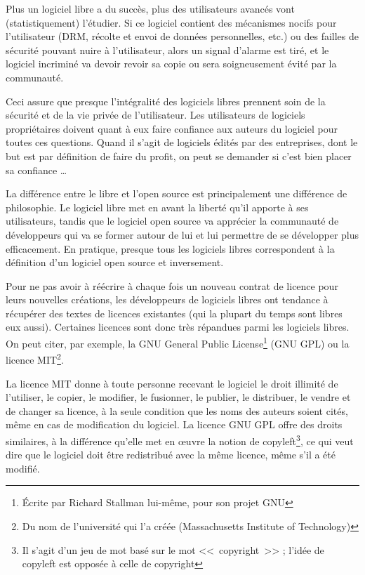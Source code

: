 Plus un logiciel libre a du succès, plus des utilisateurs avancés vont (statistiquement) l'étudier.
Si ce logiciel contient des mécanismes nocifs pour l'utilisateur (DRM, récolte et envoi de données personnelles, etc.) ou des failles de sécurité pouvant nuire à l'utilisateur, alors un signal d'alarme est tiré, et le logiciel incriminé va devoir revoir sa copie ou sera soigneusement évité par la communauté.

Ceci assure que presque l'intégralité des logiciels libres prennent soin de la sécurité et de la vie privée de l'utilisateur.
Les utilisateurs de logiciels propriétaires doivent quant à eux faire confiance aux auteurs du logiciel pour toutes ces questions.
Quand il s'agit de logiciels édités par des entreprises, dont le but est par définition de faire du profit, on peut se demander si c'est bien placer sa confiance \dots{}

La différence entre le libre et l'open source est principalement une différence de philosophie.
Le logiciel libre met en avant la liberté qu'il apporte à ses utilisateurs, tandis que le logiciel open source va apprécier la communauté de développeurs qui va se former autour de lui et lui permettre de se développer plus efficacement.
En pratique, presque tous les logiciels libres correspondent à la définition d'un logiciel open source et inversement.

Pour ne pas avoir à réécrire à chaque fois un nouveau contrat de licence pour leurs nouvelles créations, les développeurs de logiciels libres ont tendance à récupérer des textes de licences existantes (qui la plupart du temps sont libres eux aussi).
Certaines licences sont donc très répandues parmi les logiciels libres.
On peut citer, par exemple, la GNU General Public License\footnote{Écrite par Richard Stallman lui-même, pour son projet GNU} (GNU GPL) ou la licence MIT\footnote{Du nom de l'université qui l'a créée (Massachusetts Institute of Technology)}.

La licence MIT donne à toute personne recevant le logiciel le droit illimité de l'utiliser, le copier, le modifier, le fusionner, le publier, le distribuer, le vendre et de changer sa licence, à la seule condition que les noms des auteurs soient cités, même en cas de modification du logiciel.
La licence GNU GPL offre des droits similaires, à la différence qu'elle met en œuvre la notion de copyleft\footnote{Il s'agit d'un jeu de mot basé sur le mot <<~copyright~>> ; l'idée de copyleft est opposée à celle de copyright}, ce qui veut dire que le logiciel doit être redistribué avec la même licence, même s'il a été modifié.

